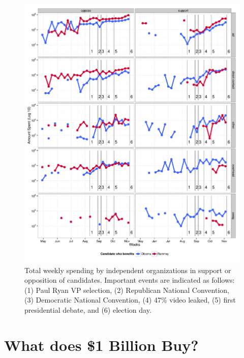 \documentclass[11pt]{article}\usepackage{graphicx, color}
\newenvironment{knitrout}{}{} %
\begin{document}
\begin{knitrout}
\color{fgcolor}\begin{figure}[H]


{\centering \includegraphics[width=\textwidth]{figure/temporal_plot} 

}

\caption[Total weekly spending by independent organizations in support or opposition of candidates]{Total weekly spending by independent organizations in support or opposition of candidates. Important events are indicated as follows: (1) Paul Ryan VP selection, (2) Republican National Convention, (3) Democratic National Convention, (4) 47\% video leaked, (5) first presidential debate, and (6) election day.\label{fig:temporal_plot}}
\end{figure}


\end{knitrout}



\section{What does \$1 Billion Buy?}
\end{document}
